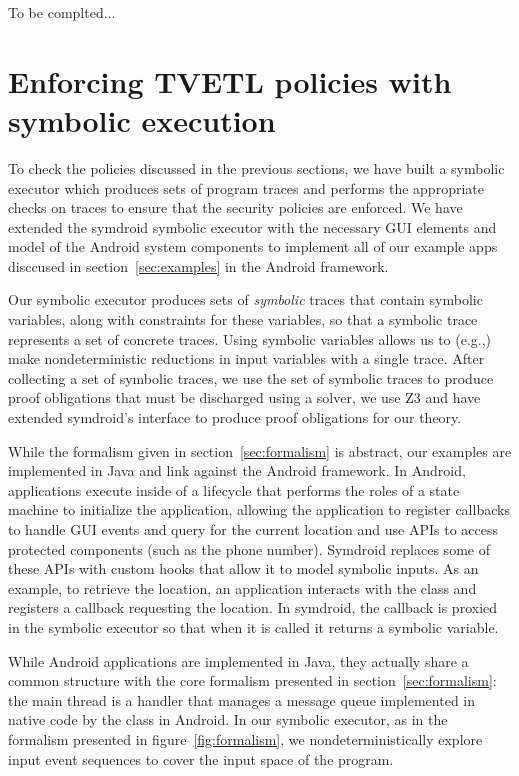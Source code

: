 \documentclass[conference]{IEEEtran}
\newcommand{\code}[1]{\text{\lstinline!#1!}}
\theoremstyle{definition}
\begin{document}
\begin{Proof}
  To be complted...
\end{Proof}

\section{Enforcing TVETL policies with symbolic execution}
\label{sec:symbolic}

To check the policies discussed in the previous sections, we have
built a symbolic executor which produces sets of program traces and
performs the appropriate checks on traces to ensure that the security
policies are enforced.  We have extended the symdroid \cite{symdroid}
symbolic executor with the necessary GUI elements and model of the
Android system components to implement all of our example apps
disccused in section~\ref{sec:examples} in the Android framework.

Our symbolic executor produces sets of \emph{symbolic} traces that
contain symbolic variables, along with constraints for these
variables, so that a symbolic trace represents a set of concrete
traces.  Using symbolic variables allows us to (e.g.,) make
nondeterministic reductions in input variables with a single trace.
After collecting a set of symbolic traces, we use the set of symbolic
traces to produce proof obligations that must be discharged using a
solver, we use Z3 \cite{z3} and have extended symdroid's interface to
produce proof obligations for our theory.

While the formalism given in section~\ref{sec:formalism} is abstract,
our examples are implemented in Java and link against the Android
framework.  In Android, applications execute inside of a lifecycle
that performs the roles of a state machine to initialize the
application, allowing the application to register callbacks to handle
GUI events and query for the current location and use APIs to access
protected components (such as the phone number).  Symdroid replaces
some of these APIs with custom hooks that allow it to model symbolic
inputs.  As an example, to retrieve the location, an application
interacts with the \code{LocationManager} class and registers a
callback requesting the location.  In symdroid, the callback is
proxied in the symbolic executor so that when it is called it returns
a symbolic variable.

While Android applications are implemented in Java, they actually
share a common structure with the core formalism presented in
section~\ref{sec:formalism}: the main thread is a handler that manages
a message queue implemented in native code by the \code{Looper} class
in Android.  In our symbolic executor, as in the formalism presented
in figure~\ref{fig:formalism}, we nondeterministically explore input
event sequences to cover the input space of the program.
\end{document}
